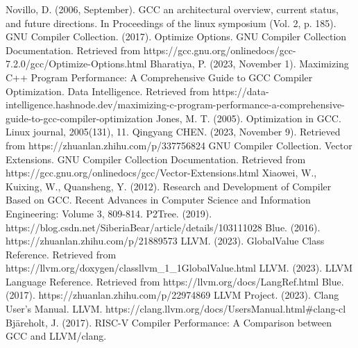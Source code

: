 \documentclass[conference]{IEEEtran}
\begin{document}
\begin{thebibliography}{00}

	 Novillo, D. (2006, September). GCC an architectural overview, current status, and future directions. In Proceedings of the linux symposium (Vol. 2, p. 185).
	 GNU Compiler Collection. (2017). Optimize Options. GNU Compiler Collection Documentation. Retrieved from https://gcc.gnu.org/onlinedocs/gcc-7.2.0/gcc/Optimize-Options.html
	 Bharatiya, P. (2023, November 1). Maximizing C++ Program Performance: A Comprehensive Guide to GCC Compiler Optimization. Data Intelligence. Retrieved from https://data-intelligence.hashnode.dev/maximizing-c-program-performance-a-comprehensive-guide-to-gcc-compiler-optimization
	 Jones, M. T. (2005). Optimization in GCC. Linux journal, 2005(131), 11.
	 Qingyang CHEN. (2023, November 9). Retrieved from https://zhuanlan.zhihu.com/p/337756824
	 GNU Compiler Collection. Vector Extensions. GNU Compiler Collection Documentation. Retrieved from https://gcc.gnu.org/onlinedocs/gcc/Vector-Extensions.html
	 Xiaowei, W., Kuixing, W., Quansheng, Y. (2012). Research and Development of Compiler Based on GCC. Recent Advances in Computer Science and Information Engineering: Volume 3, 809-814.
	 P2Tree. (2019). https://blog.csdn.net/SiberiaBear/article/details/103111028
	 Blue. (2016). https://zhuanlan.zhihu.com/p/21889573
	 LLVM. (2023). GlobalValue Class Reference. Retrieved from https://llvm.org/doxygen/classllvm\_1\_1GlobalValue.html
	 LLVM. (2023). LLVM Language Reference. Retrieved from https://llvm.org/docs/LangRef.html
	 Blue. (2017). https://zhuanlan.zhihu.com/p/22974869
	 LLVM Project. (2023). Clang User's Manual. LLVM. https://clang.llvm.org/docs/UsersManual.html\#clang-cl
	 Bjäreholt, J. (2017). RISC-V Compiler Performance: A Comparison between GCC and LLVM/clang.


\end{thebibliography}

\vspace{12pt}
\end{document}

